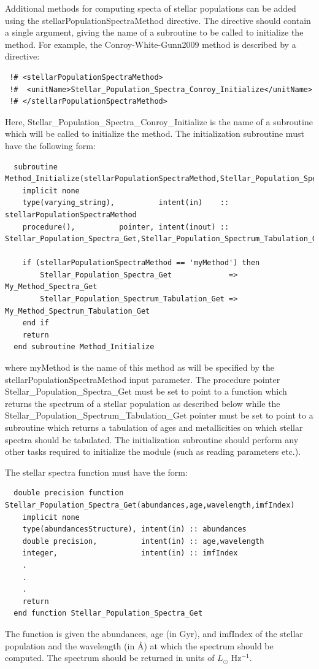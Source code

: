 Additional methods for computing specta of stellar populations can be added using the {\normalfont \ttfamily stellarPopulationSpectraMethod} directive. The directive should contain a single argument, giving the name of a subroutine to be called to initialize the method. For example, the {\normalfont \ttfamily Conroy-White-Gunn2009} method is described by a directive:
\begin{verbatim}
 !# <stellarPopulationSpectraMethod>
 !#  <unitName>Stellar_Population_Spectra_Conroy_Initialize</unitName>
 !# </stellarPopulationSpectraMethod>
\end{verbatim}
Here, {\normalfont \ttfamily Stellar\_Population\_Spectra\_Conroy\_Initialize} is the name of a subroutine which will be called to initialize the method. The initialization subroutine must have the following form:
\begin{verbatim}
  subroutine Method_Initialize(stellarPopulationSpectraMethod,Stellar_Population_Spectra_Get,Stellar_Population_Spectrum_Tabulation_Get)
    implicit none
    type(varying_string),          intent(in)    :: stellarPopulationSpectraMethod
    procedure(),          pointer, intent(inout) :: Stellar_Population_Spectra_Get,Stellar_Population_Spectrum_Tabulation_Get
    
    if (stellarPopulationSpectraMethod == 'myMethod') then
        Stellar_Population_Spectra_Get             => My_Method_Spectra_Get
        Stellar_Population_Spectrum_Tabulation_Get => My_Method_Spectrum_Tabulation_Get
    end if
    return
  end subroutine Method_Initialize
\end{verbatim}
where {\normalfont \ttfamily myMethod} is the name of this method as will be specified by the {\normalfont \ttfamily stellarPopulationSpectraMethod} input parameter. The procedure pointer {\normalfont \ttfamily Stellar\_Population\_Spectra\_Get} must be set to point to a function which returns the spectrum of a stellar population as described below while the {\normalfont \ttfamily Stellar\_Population\_Spectrum\_Tabulation\_Get} pointer must be set to point to a subroutine which returns a tabulation of ages and metallicities on which stellar spectra should be tabulated. The initialization subroutine should perform any other tasks required to initialize the module (such as reading parameters etc.).

The stellar spectra function must have the form:
\begin{verbatim}
  double precision function Stellar_Population_Spectra_Get(abundances,age,wavelength,imfIndex)
    implicit none
    type(abundancesStructure), intent(in) :: abundances
    double precision,          intent(in) :: age,wavelength
    integer,                   intent(in) :: imfIndex
    .
    .
    .
    return
  end function Stellar_Population_Spectra_Get
\end{verbatim}
The function is given the {\normalfont \ttfamily abundances}, {\normalfont \ttfamily age} (in Gyr), and {\normalfont \ttfamily imfIndex} of the stellar population and the {\normalfont \ttfamily wavelength} (in \AA) at which the spectrum should be computed. The spectrum should be returned in units of $L_\odot$ Hz$^{-1}$.


